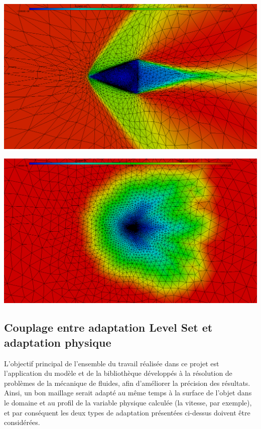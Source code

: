 \begingroup
	\begin{minipage}[t]{.5\linewidth}
		\includegraphics[scale=.15]{Bordeaux/figures/AdapPhysique/u.png}
	\end{minipage}
	\hfill
	\begin{minipage}[t]{.5\linewidth}
		\includegraphics[scale=.15]{Bordeaux/figures/AdapPhysique/met.png}
	\end{minipage}	
\endgroup

\subsection{Couplage entre adaptation Level Set et adaptation physique}

\indent L'objectif principal de l'ensemble du travail réalisée dans ce projet est l'application du modèle et de la bibliothèque développés à la résolution de problèmes de la mécanique de fluides, afin d'améliorer la précision des résultats. Ainsi, un bon maillage serait adapté au même temps à la surface de l'objet dans le domaine et au profil de la variable physique calculée (la vitesse, par exemple), et par conséquent les deux types de adaptation présentées ci-dessus doivent être considérées.

